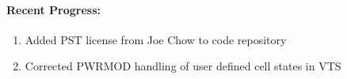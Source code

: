 \documentclass[12pt]{article}
\begin{document}
\begin{multicols}{2}
\raggedright

\paragraph{Recent Progress:}
\begin{comment}

		\itemsep0em 
		\item Added to global g and VTS:
		\begin{minipage}{\linewidth}
						\begin{itemize}
				\itemsep0em 
						\footnotesize
							\item ivmmod
							\item pwrmod
						\end{itemize}
				\end{minipage}
		\item\href{https://github.com/thadhaines/MT-Tech-SETO/blob/master/researchDocs/TEX/one-offs/200804-VTSexplained/200804-VTSexplained.pdf}{Updated VTS documentation}
		\item\href{https://github.com/thadhaines/MT-Tech-SETO/blob/master/researchDocs/TEX/one-offs/200806-ExtendedVersionComp/200806-ExtendedVersionComp.pdf}{Created 4 minute simulation showing VTS is $\approx$14x faster than PST 3.1.1}
		\item\href{https://github.com/thadhaines/MT-Tech-SETO/blob/master/researchDocs/TEX/one-offs/200806-ExtendedVTSdetail/200806-ExtendedVTSdetail.pdf}{Created a document showing possible VTS switching issues.}
		\item `Single Time Block' idea tested - not viable due to MATLAB solver operations.
		\item \href{https://github.com/thadhaines/MT-Tech-SETO/blob/master/researchDocs/TEX/one-offs/200709-PSTsetoVersionChanges/200709-PSTsetoVersionChanges.pdf}{Updated pst SETO change doc}
		\item \href{https://github.com/thadhaines/MT-Tech-SETO/blob/master/researchDocs/TEX/one-offs/200811-IVMwithVTS/200811-IVMwithVTS.pdf}{Tested IVM in VTS, created result doc.}
\end{comment}
	\begin{enumerate}	
		\item Added PST license from Joe Chow to code repository
		\item Corrected PWRMOD handling of user defined cell states in VTS

\end{enumerate}
\end{multicols}
\end{document}
